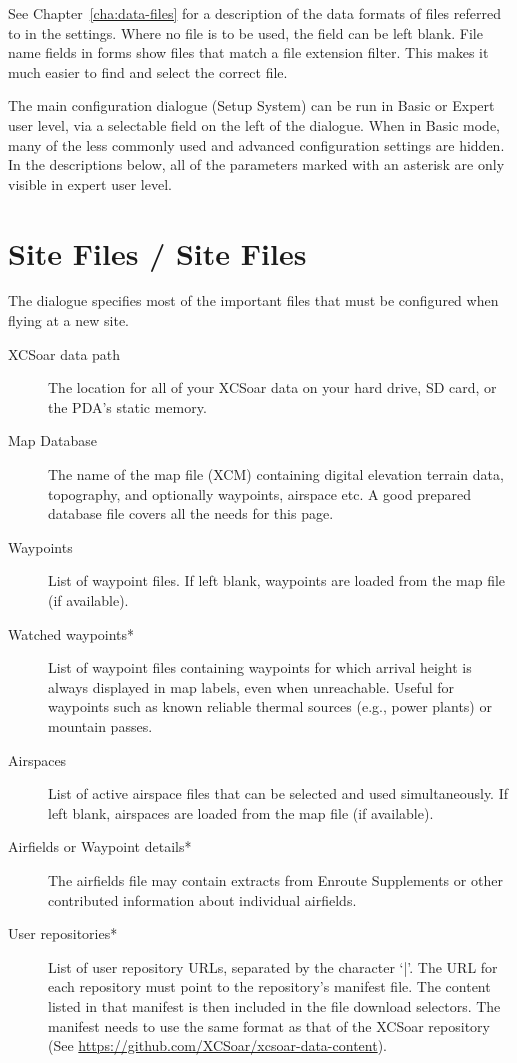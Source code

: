 See Chapter~\ref{cha:data-files} for a description of the data formats
of files referred to in the settings.  Where no file is to be used,
the field can be left blank.  File name fields in forms show files
that match a file extension filter.  This makes it much easier to find
and select the correct file.

The main configuration dialogue (Setup System) can be run in Basic or
Expert user level, via a selectable field on the left of the dialogue.
When in Basic mode, many of the less commonly used and advanced
configuration settings are hidden.  In the descriptions below,
all of the parameters marked with an asterisk are only visible in
expert user level. 

\section{Site Files / Site Files}\label{sec:site-files}
The dialogue specifies most of the important files that must be
configured when flying at a new site.

\begin{description}
\item[XCSoar data path]  The location for all of your XCSoar data on your hard drive, 
  SD card, or the PDA's static memory.
\item[Map Database]  The name of the map file (XCM) containing digital elevation
  terrain data, topography, and optionally waypoints, airspace etc. A good
  prepared database file covers all the needs for this page.
\item[Waypoints] List of waypoint files. If left blank, waypoints are loaded
  from the map file (if available).

\item[Watched waypoints*] \label{conf:watched-wps} List of waypoint files containing
  waypoints for which arrival height is always displayed in map labels, even
  when unreachable. Useful for waypoints such as known reliable thermal sources
  (e.g., power plants) or mountain passes.
\item[Airspaces]  List of active airspace files that can be selected and used
  simultaneously.  If left blank,
  airspaces are loaded from the map file (if available).
\item[Airfields or Waypoint details*]  The airfields file may contain extracts from
  Enroute Supplements or other contributed information about individual airfields.
\item[User repositories*] List of user repository URLs, separated by the character `|'.
  The URL for each repository must point to the repository's manifest file. 
  The content listed in that manifest is then included in the file download 
  selectors. The manifest needs to use the same format as that of the XCSoar repository
  (See \url{https://github.com/XCSoar/xcsoar-data-content}).
  
\end{description}


